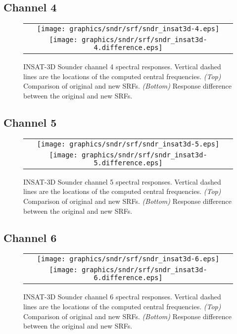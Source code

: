 \subsection{Channel 4}
\begin{figure}[H]
  \label{fig:sndr_ch4}
  \centering
  \begin{tabular}{c}
    \texttt{[image: graphics/sndr/srf/sndr\_insat3d-4.eps]} \\
    \texttt{[image: graphics/sndr/srf/sndr\_insat3d-4.difference.eps]}
  \end{tabular}
  \caption{INSAT-3D Sounder channel 4 spectral responses. Vertical dashed lines are the locations of the computed central frequencies. \emph{(Top)} Comparison of original and new SRFs. \emph{(Bottom)} Response difference between the original and new SRFs.}
\end{figure}

\subsection{Channel 5}
\begin{figure}[H]
  \label{fig:sndr_ch5}
  \centering
  \begin{tabular}{c}
    \texttt{[image: graphics/sndr/srf/sndr\_insat3d-5.eps]} \\
    \texttt{[image: graphics/sndr/srf/sndr\_insat3d-5.difference.eps]}
  \end{tabular}
  \caption{INSAT-3D Sounder channel 5 spectral responses. Vertical dashed lines are the locations of the computed central frequencies. \emph{(Top)} Comparison of original and new SRFs. \emph{(Bottom)} Response difference between the original and new SRFs.}
\end{figure}

\subsection{Channel 6}
\begin{figure}[H]
  \label{fig:sndr_ch6}
  \centering
  \begin{tabular}{c}
    \texttt{[image: graphics/sndr/srf/sndr\_insat3d-6.eps]} \\
    \texttt{[image: graphics/sndr/srf/sndr\_insat3d-6.difference.eps]}
  \end{tabular}
  \caption{INSAT-3D Sounder channel 6 spectral responses. Vertical dashed lines are the locations of the computed central frequencies. \emph{(Top)} Comparison of original and new SRFs. \emph{(Bottom)} Response difference between the original and new SRFs.}
\end{figure}


